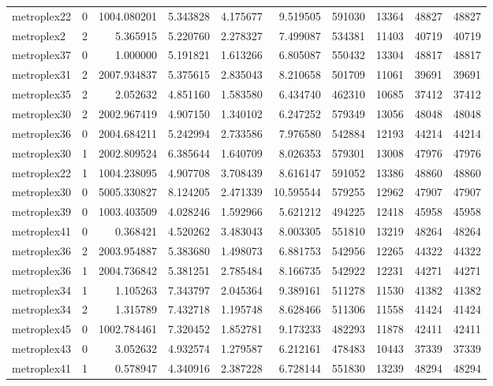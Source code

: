 \begin{longtable}{|l|r|r|r|r|r|r|r|r|r|}
metroplex22 & 0 & 1004.080201 & 5.343828 & 4.175677 & 9.519505 & 591030 & 13364 & 48827 & 48827 \\
metroplex2 & 2 & 5.365915 & 5.220760 & 2.278327 & 7.499087 & 534381 & 11403 & 40719 & 40719 \\
metroplex37 & 0 & 1.000000 & 5.191821 & 1.613266 & 6.805087 & 550432 & 13304 & 48817 & 48817 \\
metroplex31 & 2 & 2007.934837 & 5.375615 & 2.835043 & 8.210658 & 501709 & 11061 & 39691 & 39691 \\
metroplex35 & 2 & 2.052632 & 4.851160 & 1.583580 & 6.434740 & 462310 & 10685 & 37412 & 37412 \\
metroplex30 & 2 & 2002.967419 & 4.907150 & 1.340102 & 6.247252 & 579349 & 13056 & 48048 & 48048 \\
metroplex36 & 0 & 2004.684211 & 5.242994 & 2.733586 & 7.976580 & 542884 & 12193 & 44214 & 44214 \\
metroplex30 & 1 & 2002.809524 & 6.385644 & 1.640709 & 8.026353 & 579301 & 13008 & 47976 & 47976 \\
metroplex22 & 1 & 1004.238095 & 4.907708 & 3.708439 & 8.616147 & 591052 & 13386 & 48860 & 48860 \\
metroplex30 & 0 & 5005.330827 & 8.124205 & 2.471339 & 10.595544 & 579255 & 12962 & 47907 & 47907 \\
metroplex39 & 0 & 1003.403509 & 4.028246 & 1.592966 & 5.621212 & 494225 & 12418 & 45958 & 45958 \\
metroplex41 & 0 & 0.368421 & 4.520262 & 3.483043 & 8.003305 & 551810 & 13219 & 48264 & 48264 \\
metroplex36 & 2 & 2003.954887 & 5.383680 & 1.498073 & 6.881753 & 542956 & 12265 & 44322 & 44322 \\
metroplex36 & 1 & 2004.736842 & 5.381251 & 2.785484 & 8.166735 & 542922 & 12231 & 44271 & 44271 \\
metroplex34 & 1 & 1.105263 & 7.343797 & 2.045364 & 9.389161 & 511278 & 11530 & 41382 & 41382 \\
metroplex34 & 2 & 1.315789 & 7.432718 & 1.195748 & 8.628466 & 511306 & 11558 & 41424 & 41424 \\
metroplex45 & 0 & 1002.784461 & 7.320452 & 1.852781 & 9.173233 & 482293 & 11878 & 42411 & 42411 \\
metroplex43 & 0 & 3.052632 & 4.932574 & 1.279587 & 6.212161 & 478483 & 10443 & 37339 & 37339 \\
metroplex41 & 1 & 0.578947 & 4.340916 & 2.387228 & 6.728144 & 551830 & 13239 & 48294 & 48294 \\

\end{longtable}
